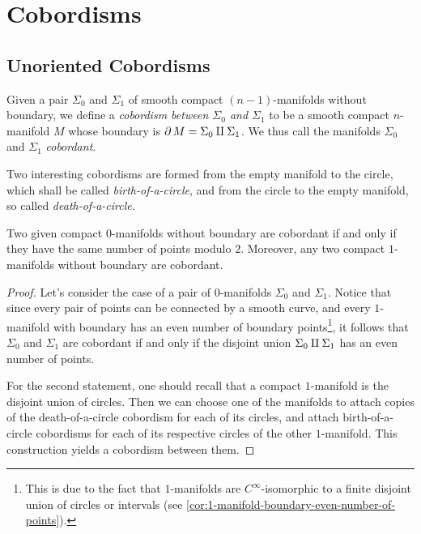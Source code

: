 \section{Cobordisms}

\subsection{Unoriented Cobordisms}

\begin{definition}
    \label{def:unoriented-cobordism}
    Given a pair \(\Sigma_0\) and \(\Sigma_1\) of smooth compact
    \((n-1)\)-manifolds without boundary, we define a \emph{cobordism between
        \(\Sigma_0\) and \(\Sigma_1\)} to be a smooth compact \(n\)-manifold \(M\)
    whose boundary is \(\operatorname{\partial} M = \Sigma_0 \amalg \Sigma_1\). We thus call the
    manifolds \(\Sigma_0\) and \(\Sigma_1\) \emph{cobordant}.
\end{definition}

\begin{example}
    \label{exp:birth-death-circle}
    Two interesting cobordisms are formed from the empty manifold to the circle,
    which shall be called \emph{birth-of-a-circle}, and from the circle to the empty
    manifold, so called \emph{death-of-a-circle}.
\end{example}

\begin{lemma}
    \label{lem:cobordant-0-and-1-manifolds}
    Two given compact \(0\)-manifolds without boundary are cobordant if and only if
    they have the same number of points modulo \(2\). Moreover, any two compact
    \(1\)-manifolds without boundary are cobordant.
\end{lemma}

\begin{proof}
    Let's consider the case of a pair of \(0\)-manifolds \(\Sigma_0\) and
    \(\Sigma_1\). Notice that since every pair of points can be connected by a
    smooth curve, and every \(1\)-manifold with boundary has an even number of
    boundary points\footnote{This is due to the fact that \(1\)-manifolds are
        \(C^{\infty}\)-isomorphic to a finite disjoint union of circles or intervals
        (see \cref{cor:1-manifold-boundary-even-number-of-points}).}, it follows that
    \(\Sigma_0\) and \(\Sigma_1\) are cobordant if and only if the disjoint union
    \(\Sigma_0 \amalg \Sigma_1\) has an even number of points.

    For the second statement, one should recall that a compact \(1\)-manifold is the
    disjoint union of circles. Then we can choose one of the manifolds to
    attach copies of the death-of-a-circle cobordism for each of its circles, and
    attach birth-of-a-circle cobordisms for each of its respective
    circles of the other \(1\)-manifold. This construction yields a cobordism
    between them.
\end{proof}


